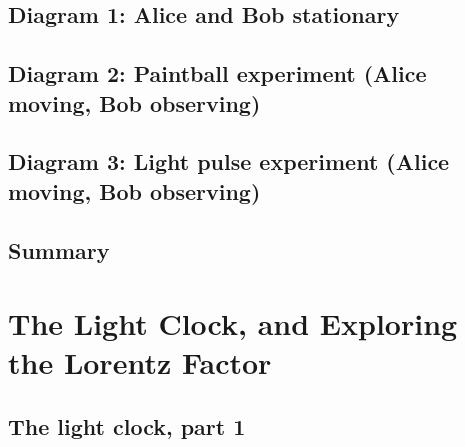 \documentclass[pagesize,headsepline,10pt,parskip=half]{scrreprt}
\begin{document}
      \subsection{Diagram 1: Alice and Bob stationary}
      \subsection{Diagram 2: Paintball experiment (Alice moving, Bob observing)}
      \subsection{Diagram 3: Light pulse experiment (Alice moving, Bob observing)}
      \subsection{Summary}

    \section{The Light Clock, and Exploring the Lorentz Factor}
      \subsection{The light clock, part 1}
\end{document}

